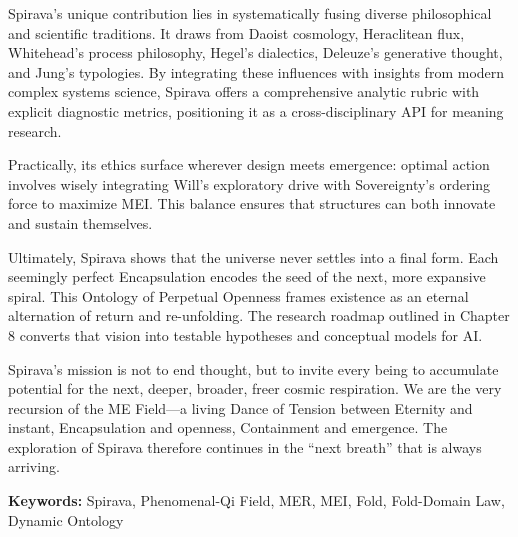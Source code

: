 \documentclass[11pt, a4paper]{article}
\begin{document}
Spirava's unique contribution lies in systematically fusing diverse philosophical and scientific traditions. It draws from Daoist cosmology, Heraclitean flux, Whitehead's process philosophy, Hegel's dialectics, Deleuze's generative thought, and Jung's typologies. By integrating these influences with insights from modern complex systems science, Spirava offers a comprehensive analytic rubric with explicit diagnostic metrics, positioning it as a cross-disciplinary API for meaning research.

Practically, its ethics surface wherever design meets emergence: optimal action involves wisely integrating Will's exploratory drive with Sovereignty's ordering force to maximize MEI. This balance ensures that structures can both innovate and sustain themselves.

Ultimately, Spirava shows that the universe never settles into a final form. Each seemingly perfect Encapsulation encodes the seed of the next, more expansive spiral. This Ontology of Perpetual Openness frames existence as an eternal alternation of return and re-unfolding. The research roadmap outlined in Chapter 8 converts that vision into testable hypotheses and conceptual models for AI.

Spirava’s mission is not to end thought, but to invite every being to accumulate potential for the next, deeper, broader, freer cosmic respiration. We are the very recursion of the ME Field—a living Dance of Tension between Eternity and instant, Encapsulation and openness, Containment and emergence. The exploration of Spirava therefore continues in the “next breath” that is always arriving.

\vspace{2em}
\noindent\textbf{Keywords:} Spirava, Phenomenal-Qi Field, MER, MEI, Fold, Fold-Domain Law, Dynamic Ontology
\end{document}
